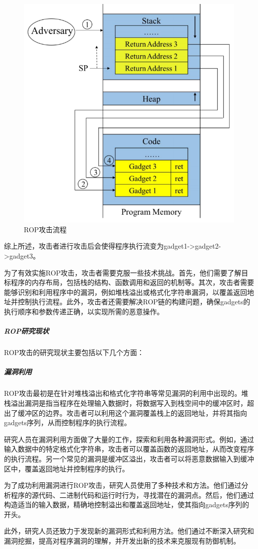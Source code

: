 \documentclass[12pt,a4paper]{ctexart}
\numberwithin{figure}{section}
\begin{document}
\begin{figure}
    \centering
    \includegraphics[scale=0.35]{graph/ROP.png}
    \caption{ROP攻击流程}
    \label{ROP}
\end{figure}
综上所述，攻击者进行攻击后会使得程序执行流变为gadget1->gadget2->gadget3。

\par 为了有效实施ROP攻击，攻击者需要克服一些技术挑战。首先，他们需要了解目标程序的内存布局，包括栈的结构、函数调用和返回的机制等。其次，攻击者需要能够识别和利用程序中的漏洞，例如堆栈溢出或格式化字符串漏洞，以覆盖返回地址并控制执行流程。此外，攻击者还需要解决ROP链的构建问题，确保gadgets的执行顺序和参数传递正确，以实现所需的恶意操作。

\subparagraph{ROP研究现状}
ROP攻击的研究现状主要包括以下几个方面：
\subparagraph{漏洞利用}
\par ROP攻击最初是在针对堆栈溢出和格式化字符串等常见漏洞的利用中出现的。堆栈溢出漏洞是指当程序在处理输入数据时，将数据写入到栈空间中的缓冲区时，超出了缓冲区的边界。攻击者可以利用这个漏洞覆盖栈上的返回地址，并将其指向gadgets序列，从而控制程序的执行流程。
\par 研究人员在漏洞利用方面做了大量的工作，探索和利用各种漏洞形式。例如，通过输入数据中的特定格式化字符串，攻击者可以覆盖函数的返回地址，从而改变程序的执行流程。另一个常见的漏洞是缓冲区溢出，攻击者可以将恶意数据输入到缓冲区中，覆盖返回地址并控制程序的执行。
\par 为了成功利用漏洞进行ROP攻击，研究人员使用了多种技术和方法。他们通过分析程序的源代码、二进制代码和运行时行为，寻找潜在的漏洞点。然后，他们通过构造适当的输入数据，精确地控制溢出和覆盖返回地址，使其指向gadgets序列的开头。
\par 此外，研究人员还致力于发现新的漏洞形式和利用方法。他们通过不断深入研究和漏洞挖掘，提高对程序漏洞的理解，并开发出新的技术来克服现有防御机制。
\end{document}
